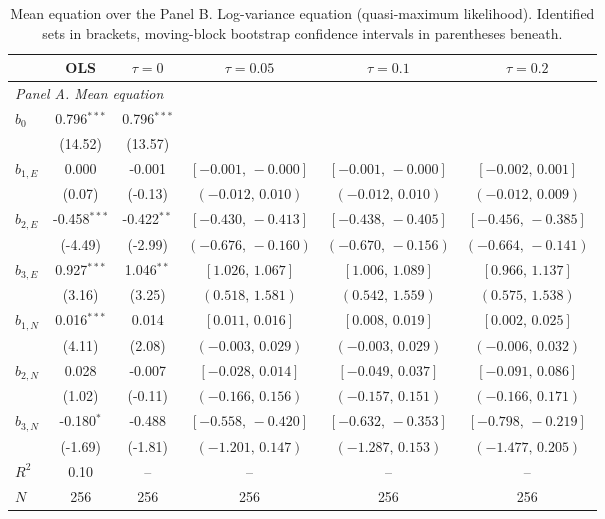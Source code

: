 \documentclass[11pt]{article}
\begin{document}
\begin{table}[!htbp]
\centering
\begin{threeparttable}
\caption{Mean equation over the Panel B. Log-variance equation (quasi-maximum likelihood). Identified sets in brackets, moving-block bootstrap confidence intervals in parentheses beneath.}
\label{tab:log_var_eq_panel_ppml}
\scriptsize\setlength{\tabcolsep}{3pt}
\begin{tabular}{lccccc}
\toprule
 & OLS & $\tau{=}0$ & $\tau{=}0.05$ & $\tau{=}0.1$ & $\tau{=}0.2$ \\
\midrule
\multicolumn{6}{l}{\textit{Panel A. Mean equation}} \\
\midrule
$b_0$ & 0.796$^{***}$ & 0.796$^{***}$ &  &  &  \\
 & (14.52) & (13.57) &  &  &  \\
$b_{1,E}$ & 0.000 & -0.001 & $[-0.001,\,-0.000]$ & $[-0.001,\,-0.000]$ & $[-0.002,\,0.001]$ \\
 & (0.07) & (-0.13) & $(-0.012,\,0.010)$ & $(-0.012,\,0.010)$ & $(-0.012,\,0.009)$ \\
$b_{2,E}$ & -0.458$^{***}$ & -0.422$^{**}$ & $[-0.430,\,-0.413]$ & $[-0.438,\,-0.405]$ & $[-0.456,\,-0.385]$ \\
 & (-4.49) & (-2.99) & $(-0.676,\,-0.160)$ & $(-0.670,\,-0.156)$ & $(-0.664,\,-0.141)$ \\
$b_{3,E}$ & 0.927$^{***}$ & 1.046$^{**}$ & $[1.026,\,1.067]$ & $[1.006,\,1.089]$ & $[0.966,\,1.137]$ \\
 & (3.16) & (3.25) & $(0.518,\,1.581)$ & $(0.542,\,1.559)$ & $(0.575,\,1.538)$ \\
\midrule
$b_{1,N}$ & 0.016$^{***}$ & 0.014 & $[0.011,\,0.016]$ & $[0.008,\,0.019]$ & $[0.002,\,0.025]$ \\
 & (4.11) & (2.08) & $(-0.003,\,0.029)$ & $(-0.003,\,0.029)$ & $(-0.006,\,0.032)$ \\
$b_{2,N}$ & 0.028 & -0.007 & $[-0.028,\,0.014]$ & $[-0.049,\,0.037]$ & $[-0.091,\,0.086]$ \\
 & (1.02) & (-0.11) & $(-0.166,\,0.156)$ & $(-0.157,\,0.151)$ & $(-0.166,\,0.171)$ \\
$b_{3,N}$ & -0.180$^{*}$ & -0.488 & $[-0.558,\,-0.420]$ & $[-0.632,\,-0.353]$ & $[-0.798,\,-0.219]$ \\
 & (-1.69) & (-1.81) & $(-1.201,\,0.147)$ & $(-1.287,\,0.153)$ & $(-1.477,\,0.205)$ \\
\midrule
$R^2$ & 0.10 & -- & -- & -- & -- \\
$N$ & 256 & 256 & 256 & 256 & 256 \\

\end{tabular}
\end{threeparttable}
\end{table}
\end{document}
